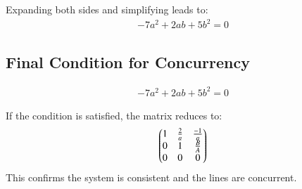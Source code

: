 \documentclass{article}
\begin{document}
Expanding both sides and simplifying leads to:
\begin{align}
-7a^2 + 2ab + 5b^2 = 0
\end{align}

\subsection*{Final Condition for Concurrency}

\begin{align}
\boxed{-7a^2 + 2ab + 5b^2 = 0}
\end{align}

If the condition is satisfied, the matrix reduces to:
\begin{align}\begin{pmatrix}1 & \frac{2}{a} & \frac{-1}{a} \\ 0 & 1 & \frac{B}{A} \\ 0 & 0 & 0\end{pmatrix}\end{align}
This confirms the system is consistent and the lines are concurrent.
\end{document}

